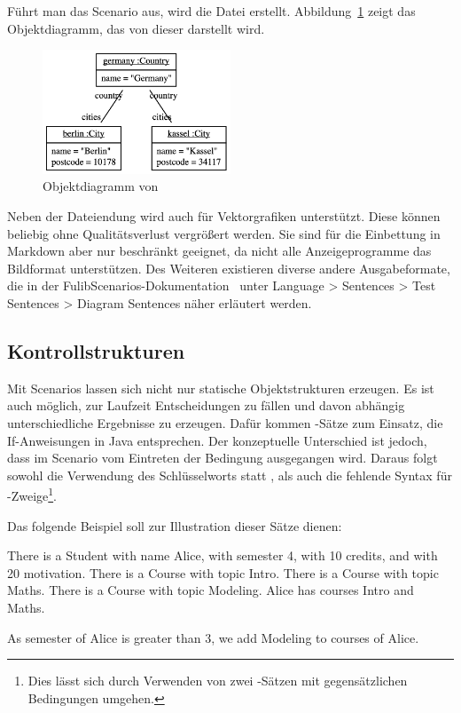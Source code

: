 Führt man das Scenario aus, wird die Datei  erstellt.
Abbildung~\ref{fig:germany.png} zeigt das Objektdiagramm, das von dieser darstellt wird.

\begin{figure}
    \centering
    \includegraphics[width=0.5\textwidth]{chapter/fulib-scenarios/img/germany.png}
    \caption{Objektdiagramm von }
    \label{fig:germany.png}
\end{figure}

Neben der Dateiendung  wird auch  für Vektorgrafiken unterstützt.
Diese können beliebig ohne Qualitätsverlust vergrößert werden.
Sie sind für die Einbettung in Markdown aber nur beschränkt geeignet, da nicht alle Anzeigeprogramme das Bildformat unterstützen.
Des Weiteren existieren diverse andere Ausgabeformate, die in der FulibScenarios-Dokumentation~\cite{documentation} unter Language > Sentences > Test Sentences > Diagram Sentences näher erläutert werden.

\subsection{Kontrollstrukturen}\label{subsec:control-structures}

Mit Scenarios lassen sich nicht nur statische Objektstrukturen erzeugen.
Es ist auch möglich, zur Laufzeit Entscheidungen zu fällen und davon abhängig unterschiedliche Ergebnisse zu erzeugen.
Dafür kommen -Sätze zum Einsatz, die If-Anweisungen in Java entsprechen.
Der konzeptuelle Unterschied ist jedoch, dass im Scenario vom Eintreten der Bedingung ausgegangen wird.
Daraus folgt sowohl die Verwendung des Schlüsselworts  statt , als auch die fehlende Syntax für -Zweige\footnote{
Dies lässt sich durch Verwenden von zwei -Sätzen mit gegensätzlichen Bedingungen umgehen.
}.

Das folgende Beispiel soll zur Illustration dieser Sätze dienen:

\begin{codeblock}
    There is a Student with name Alice, with semester 4, with 10 credits, and with 20 motivation.
    There is a Course with topic Intro.
    There is a Course with topic Maths.
    There is a Course with topic Modeling.
    Alice has courses Intro and Maths.

    As semester of Alice is greater than 3, we add Modeling to courses of Alice.
\end{codeblock}

